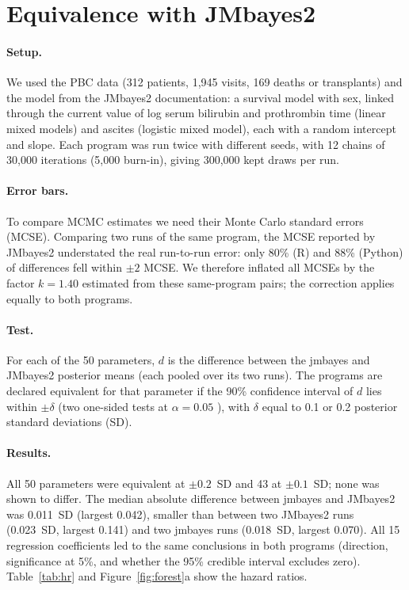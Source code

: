 \documentclass[11pt]{article}
\begin{document}
\section{Equivalence with JMbayes2}\label{sec:equiv}

\paragraph{Setup.} We used the PBC data \cite{murtaugh1994} (312 patients, 1,945 visits,
169 deaths or transplants) and the model from the JMbayes2 documentation: a survival model
with sex, linked through the current value of log serum bilirubin and prothrombin time
(linear mixed models) and ascites (logistic mixed model), each with a random intercept and
slope. Each program was run twice with different seeds, with 12 chains of 30,000 iterations
(5,000 burn-in), giving 300,000 kept draws per run.

\paragraph{Error bars.} To compare MCMC estimates we need their Monte Carlo standard errors
(MCSE). Comparing two runs of the same program, the MCSE reported by JMbayes2 understated
the real run-to-run error: only 80\% (R) and 88\% (Python) of differences fell within
$\pm 2$ MCSE. We therefore inflated all MCSEs by the factor $k = 1.40$ estimated from these
same-program pairs; the correction applies equally to both programs.

\paragraph{Test.} For each of the 50 parameters, $d$ is the difference between the jmbayes
and JMbayes2 posterior means (each pooled over its two runs). The programs are declared
equivalent for that parameter if the 90\% confidence interval of $d$ lies within $\pm\delta$
(two one-sided tests at $\alpha = 0.05$ \cite{schuirmann1987}), with $\delta$ equal to 0.1
or 0.2 posterior standard deviations (SD).

\paragraph{Results.} All 50 parameters were equivalent at $\pm 0.2$~SD and 43 at
$\pm 0.1$~SD; none was shown to differ. The median absolute difference between jmbayes and
JMbayes2 was 0.011~SD (largest 0.042), smaller than between two JMbayes2 runs (0.023~SD,
largest 0.141) and two jmbayes runs (0.018~SD, largest 0.070). All 15 regression
coefficients led to the same conclusions in both programs (direction, significance at 5\%,
and whether the 95\% credible interval excludes zero). Table~\ref{tab:hr} and
Figure~\ref{fig:forest}a show the hazard ratios.
\end{document}
